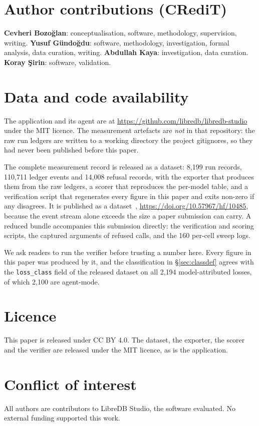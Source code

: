 \documentclass[11pt]{article}
\newcommand{\code}[1]{\texttt{\small #1}}
\begin{document}
\section*{Author contributions (CRediT)}
\noindent
\textbf{Cevheri Bozo\u{g}lan}: conceptualisation, software, methodology, supervision, writing.
\textbf{Yusuf G\"{u}ndo\u{g}du}: software, methodology, investigation, formal analysis, data curation, writing.
\textbf{Abdullah Kaya}: investigation, data curation.
\textbf{Koray \c{S}irin}: software, validation.

\section*{Data and code availability}
The application and its agent are at \url{https://github.com/libredb/libredb-studio} under the MIT licence.
The measurement artefacts are \emph{not} in that repository: the raw run ledgers are written to a working
directory the project gitignores, so they had never been published before this paper.

The complete measurement record is released as a dataset: 8{,}199 run records, 110{,}711 ledger events and
14{,}008 refusal records, with the exporter that produces them from the raw ledgers, a scorer that reproduces the
per-model table, and a verification script that regenerates every figure in this paper and exits non-zero if any
disagrees. It is published as a dataset~\cite{libredb2026dataset},
\url{https://doi.org/10.57967/hf/10485}, because the event stream alone exceeds the size a paper submission
can carry. A reduced bundle accompanies this submission directly: the verification and scoring
scripts, the captured arguments of refused calls, and the 160 per-cell sweep logs.

We ask readers to run the verifier before trusting a number here. Every figure in this paper was produced by it,
and the classification in \S\ref{sec:classdef} agrees with the \code{loss\_class} field of the released dataset
on all 2{,}194 model-attributed losses, of which 2{,}100 are agent-mode.

\section*{Licence}
This paper is released under CC BY 4.0. The dataset, the exporter, the scorer and the verifier are released under
the MIT licence, as is the application.

\section*{Conflict of interest}
All authors are contributors to LibreDB Studio, the software evaluated. No external funding supported this work.
\end{document}
